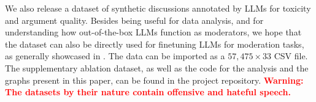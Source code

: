 %

We also release \vmd a dataset of synthetic discussions annotated by \acp{LLM} for toxicity and argument quality. Besides being useful for data analysis, and for understanding how out-of-the-box \acp{LLM} function as moderators, we hope that the dataset can also be directly used for finetuning \acp{LLM} for moderation tasks, as generally showcased in \citet{ulmer2024}. The data can be imported as a $57,475 \times 33$ CSV file\datasetlink. The supplementary ablation dataset, as well as the code for the analysis and the graphs present in this paper, can be found in the project repository\analysislink. \textbf{\textcolor{red}{Warning: The datasets by their nature contain offensive and hateful speech.}}